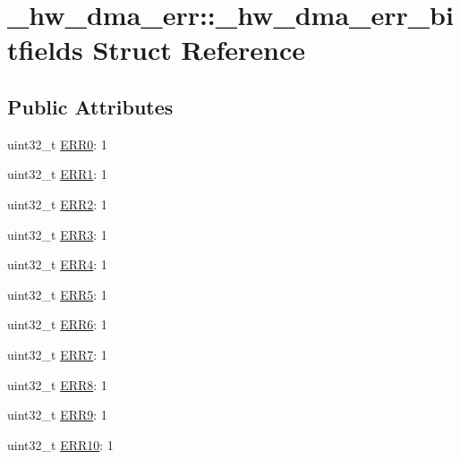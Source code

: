 \hypertarget{struct__hw__dma__err_1_1__hw__dma__err__bitfields}{}\section{\+\_\+hw\+\_\+dma\+\_\+err\+:\+:\+\_\+hw\+\_\+dma\+\_\+err\+\_\+bitfields Struct Reference}
\label{struct__hw__dma__err_1_1__hw__dma__err__bitfields}
\subsection*{Public Attributes}
\begin{DoxyCompactItemize}
\item 
uint32\+\_\+t \hyperlink{struct__hw__dma__err_1_1__hw__dma__err__bitfields_a990e0dc2cfba57f9dc88f3db746acc46}{E\+R\+R0}\+: 1
\item 
uint32\+\_\+t \hyperlink{struct__hw__dma__err_1_1__hw__dma__err__bitfields_ae1b7205b23c1d97e4d5bee882219d2d3}{E\+R\+R1}\+: 1
\item 
uint32\+\_\+t \hyperlink{struct__hw__dma__err_1_1__hw__dma__err__bitfields_ac33490d3c16342facbdf1da491200f1d}{E\+R\+R2}\+: 1
\item 
uint32\+\_\+t \hyperlink{struct__hw__dma__err_1_1__hw__dma__err__bitfields_adcb2aa035916c2800721994addc82cb4}{E\+R\+R3}\+: 1
\item 
uint32\+\_\+t \hyperlink{struct__hw__dma__err_1_1__hw__dma__err__bitfields_adf4c088b16c3d31f629a16718bb319c2}{E\+R\+R4}\+: 1
\item 
uint32\+\_\+t \hyperlink{struct__hw__dma__err_1_1__hw__dma__err__bitfields_a16ef81da7c72f47c1681669939fccf31}{E\+R\+R5}\+: 1
\item 
uint32\+\_\+t \hyperlink{struct__hw__dma__err_1_1__hw__dma__err__bitfields_a8ccde055c76b0b574ef844efed014445}{E\+R\+R6}\+: 1
\item 
uint32\+\_\+t \hyperlink{struct__hw__dma__err_1_1__hw__dma__err__bitfields_a087131d59b9255f19bd971c5175ba5e7}{E\+R\+R7}\+: 1
\item 
uint32\+\_\+t \hyperlink{struct__hw__dma__err_1_1__hw__dma__err__bitfields_af24e718b9ae20399d4204eac039c7942}{E\+R\+R8}\+: 1
\item 
uint32\+\_\+t \hyperlink{struct__hw__dma__err_1_1__hw__dma__err__bitfields_a30fcb037b1dfe676fd4d60ef06334a5b}{E\+R\+R9}\+: 1
\item 
uint32\+\_\+t \hyperlink{struct__hw__dma__err_1_1__hw__dma__err__bitfields_ad90ca663f4c112d305fff90719ae0e74}{E\+R\+R10}\+: 1

\end{DoxyCompactItemize}

